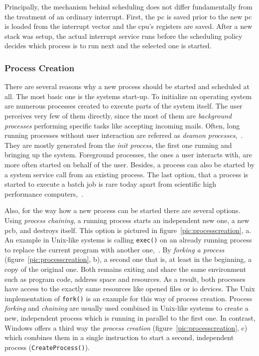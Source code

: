 Principally, the mechanism behind scheduling does not differ fundamentally from the treatment of an ordinary interrupt.
First, the \acf{pc} is saved prior to the new \ac{pc} is loaded from the interrupt vector and the \ac{cpu}'s registers are saved.
After a new stack was setup, the actual interrupt service runs before the scheduling policy decides which process is to run next and the selected one is started\cite{tanenbaum-modern-operating-systems}.

\subsubsection*{Process Creation}
There are several reasons why a new process should be started and scheduled at all.
The most basic one is the systems start-up.
To initialize an operating system are numerous processes created to execute parts of the system itself.
The user perceives very few of them directly, since the most of them are \textit{background processes} performing specific tasks like accepting incoming mails.
Often, long running processes without user interaction are referred as \textit{deamon processes}\cite{glatz2015betriebssysteme},~\cite{tanenbaum-modern-operating-systems}.
They are mostly generated from the \textit{init process}, the first one running and bringing up the system.
Foreground processes, the ones a user interacts with, are more often started on behalf of the user.
Besides, a process can also be started by a system service call from an existing process.
The last option, that a process is started to execute a batch job is rare today apart from scientific high performance computers\cite{tanenbaum-modern-operating-systems},~\cite{glatz2015betriebssysteme}.

Also, for the way how a new process can be started there are several options.
Using \textit{process chaining}, a running process starts an independent new one, a new \ac{pcb}, and destroys itself\cite{achilles2006betriebssysteme}.
This option is pictured in figure~\ref{pic:processcreation}, a.
An example in Unix-like systems is calling \texttt{exec()} on an already running process to replace the current program with another one\cite{glatz2015betriebssysteme},~\cite{tanenbaum-modern-operating-systems}.
By \textit{forking a process} (figure~\ref{pic:processcreation}, b), a second one that is, at least in the beginning, a copy of the original one.
Both remains exiting and share the same environment such as program code, address space and resources\cite{tanenbaum-modern-operating-systems}.
As a result, both processes have access to the exactly same resources like opened files or \ac{io} devices\cite{achilles2006betriebssysteme}.
The Unix implementation of \texttt{fork()} is an example for this way of process creation.
Process \textit{forking} and \textit{chaining} are usually used combined in Unix-like systems to create a new, independent process which is running in parallel to the first one\cite{tanenbaum-modern-operating-systems}.
In contrast, Windows offers a third way the \textit{process creation} (figure~\ref{pic:processcreation}, c) which combines them in a single instruction to start a second, independent process (\texttt{CreateProcess()})\cite{glatz2015betriebssysteme}.

